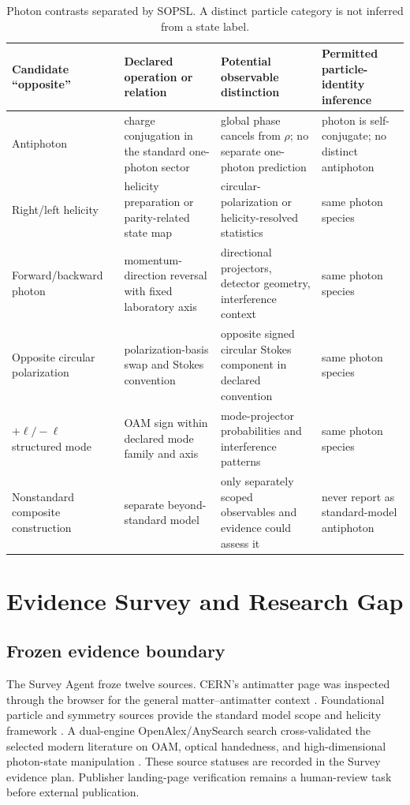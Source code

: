 \documentclass[conference]{../../../../Conference-LaTeX-template_10-17-19/IEEEtran}
\begin{document}
\begin{table}[!t]
\caption{Photon contrasts separated by SOPSL. A distinct particle category is not inferred from a state label.}
\label{tab:distinctions}
\centering
\small
\begin{tabularx}{\textwidth}{lYYY}
\toprule
Candidate ``opposite'' & Declared operation or relation & Potential observable distinction & Permitted particle-identity inference \\
\midrule
Antiphoton & charge conjugation in the standard one-photon sector & global phase cancels from $\rho$; no separate one-photon prediction & photon is self-conjugate; no distinct antiphoton \\
Right/left helicity & helicity preparation or parity-related state map & circular-polarization or helicity-resolved statistics & same photon species \\
Forward/backward photon & momentum-direction reversal with fixed laboratory axis & directional projectors, detector geometry, interference context & same photon species \\
Opposite circular polarization & polarization-basis swap and Stokes convention & opposite signed circular Stokes component in declared convention & same photon species \\
$+\ell/-\ell$ structured mode & OAM sign within declared mode family and axis & mode-projector probabilities and interference patterns & same photon species \\
Nonstandard composite construction & separate beyond-standard model & only separately scoped observables and evidence could assess it & never report as standard-model antiphoton \\
\bottomrule
\end{tabularx}
\end{table}

\section{Evidence Survey and Research Gap}
\subsection{Frozen evidence boundary}
The Survey Agent froze twelve sources. CERN’s antimatter page was inspected through the browser for the general matter--antimatter context \cite{cern_antimatter_page}. Foundational particle and symmetry sources provide the standard model scope and helicity framework \cite{pdg2022,weinberg_qft1,wigner1939,jacob_wick1959,yang1950}. A dual-engine OpenAlex/AnySearch search cross-validated the selected modern literature on OAM, optical handedness, and high-dimensional photon-state manipulation \cite{krenn2017,forbes_andrews2021,leach2009,erhard2017,gauthier2017}. These source statuses are recorded in the Survey evidence plan. Publisher landing-page verification remains a human-review task before external publication.
\end{document}
